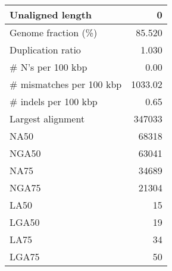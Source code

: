 \documentclass[12pt,a4paper]{article}
\begin{document}
\begin{table}[ht]
\begin{center}
\begin{tabular}{|l*{1}{|r}|}
Unaligned length & 0 \\ \hline
Genome fraction (\%) & 85.520 \\ \hline
Duplication ratio & 1.030 \\ \hline
\# N's per 100 kbp & 0.00 \\ \hline
\# mismatches per 100 kbp & 1033.02 \\ \hline
\# indels per 100 kbp & 0.65 \\ \hline
Largest alignment & 347033 \\ \hline
NA50 & 68318 \\ \hline
NGA50 & 63041 \\ \hline
NA75 & 34689 \\ \hline
NGA75 & 21304 \\ \hline
LA50 & 15 \\ \hline
LGA50 & 19 \\ \hline
LA75 & 34 \\ \hline
LGA75 & 50 \\ \hline
\end{tabular}
\end{center}
\end{table}
\end{document}
